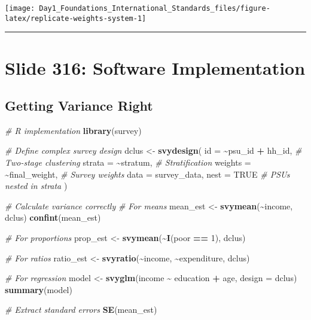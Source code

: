\documentclass[
]{article}
\newenvironment{Shaded}{\begin{snugshade}}{\end{snugshade}}
\newcommand{\AttributeTok}[1]{\textcolor[rgb]{0.13,0.29,0.53}{#1}}
\newcommand{\CommentTok}[1]{\textcolor[rgb]{0.56,0.35,0.01}{\textit{#1}}}
\newcommand{\ConstantTok}[1]{\textcolor[rgb]{0.56,0.35,0.01}{#1}}
\newcommand{\DecValTok}[1]{\textcolor[rgb]{0.00,0.00,0.81}{#1}}
\newcommand{\FunctionTok}[1]{\textcolor[rgb]{0.13,0.29,0.53}{\textbf{#1}}}
\newcommand{\NormalTok}[1]{#1}
\newcommand{\OtherTok}[1]{\textcolor[rgb]{0.56,0.35,0.01}{#1}}
\newcommand{\SpecialCharTok}[1]{\textcolor[rgb]{0.81,0.36,0.00}{\textbf{#1}}}
\begin{document}
\texttt{[image: Day1\_Foundations\_International\_Standards\_files/figure-latex/replicate-weights-system-1]}

\begin{center}\rule{0.5\linewidth}{0.5pt}\end{center}

\section{Slide 316: Software
Implementation}\label{slide-316-software-implementation}

\subsection{Getting Variance Right}\label{getting-variance-right}

\begin{Shaded}
\begin{Highlighting}[]
\CommentTok{\# R implementation}
\FunctionTok{library}\NormalTok{(survey)}

\CommentTok{\# Define complex survey design}
\NormalTok{dclus }\OtherTok{\textless{}{-}} \FunctionTok{svydesign}\NormalTok{(}
  \AttributeTok{id =} \SpecialCharTok{\textasciitilde{}}\NormalTok{psu\_id }\SpecialCharTok{+}\NormalTok{ hh\_id,      }\CommentTok{\# Two{-}stage clustering}
  \AttributeTok{strata =} \SpecialCharTok{\textasciitilde{}}\NormalTok{stratum,          }\CommentTok{\# Stratification}
  \AttributeTok{weights =} \SpecialCharTok{\textasciitilde{}}\NormalTok{final\_weight,    }\CommentTok{\# Survey weights}
  \AttributeTok{data =}\NormalTok{ survey\_data,}
  \AttributeTok{nest =} \ConstantTok{TRUE}                 \CommentTok{\# PSUs nested in strata}
\NormalTok{)}

\CommentTok{\# Calculate variance correctly}
\CommentTok{\# For means}
\NormalTok{mean\_est }\OtherTok{\textless{}{-}} \FunctionTok{svymean}\NormalTok{(}\SpecialCharTok{\textasciitilde{}}\NormalTok{income, dclus)}
\FunctionTok{confint}\NormalTok{(mean\_est)}

\CommentTok{\# For proportions  }
\NormalTok{prop\_est }\OtherTok{\textless{}{-}} \FunctionTok{svymean}\NormalTok{(}\SpecialCharTok{\textasciitilde{}}\FunctionTok{I}\NormalTok{(poor }\SpecialCharTok{==} \DecValTok{1}\NormalTok{), dclus)}

\CommentTok{\# For ratios}
\NormalTok{ratio\_est }\OtherTok{\textless{}{-}} \FunctionTok{svyratio}\NormalTok{(}\SpecialCharTok{\textasciitilde{}}\NormalTok{income, }\SpecialCharTok{\textasciitilde{}}\NormalTok{expenditure, dclus)}

\CommentTok{\# For regression}
\NormalTok{model }\OtherTok{\textless{}{-}} \FunctionTok{svyglm}\NormalTok{(income }\SpecialCharTok{\textasciitilde{}}\NormalTok{ education }\SpecialCharTok{+}\NormalTok{ age, }\AttributeTok{design =}\NormalTok{ dclus)}
\FunctionTok{summary}\NormalTok{(model)}

\CommentTok{\# Extract standard errors}
\FunctionTok{SE}\NormalTok{(mean\_est)}
\end{Highlighting}
\end{Shaded}
\end{document}
